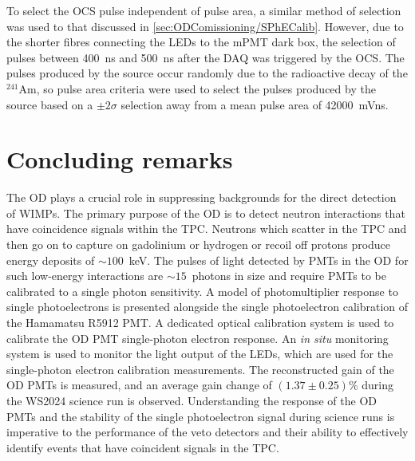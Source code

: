 To select the OCS pulse independent of pulse area, a similar method of selection was used to that discussed in \autoref{sec:ODComissioning/SPhECalib}. However, due to the shorter fibres connecting the LEDs to the mPMT dark box, the selection of pulses between 400~ns and 500~ns after the DAQ was triggered by the OCS. The pulses produced by the source occur randomly due to the radioactive decay of the $^{241}\text{Am}$, so pulse area criteria were used to select the pulses produced by the source based on a $\pm2\sigma$ selection away from a mean pulse area of 42000~mVns.

\pagebreak

\section{Concluding remarks}
The OD plays a crucial role in suppressing backgrounds for the direct detection of WIMPs. The primary purpose of the OD is to detect neutron interactions that have coincidence signals within the TPC. Neutrons which scatter in the TPC and then go on to capture on gadolinium or hydrogen or recoil off protons produce energy deposits of $\sim100$~keV. The pulses of light detected by PMTs in the OD for such low-energy interactions are $\sim15$~photons in size and require PMTs to be calibrated to a single photon sensitivity. A model of photomultiplier response to single photoelectrons is presented alongside the single photoelectron calibration of the Hamamatsu R5912 PMT. A dedicated optical calibration system is used to calibrate the OD PMT single-photon electron response. An \textit{in situ} monitoring system is used to monitor the light output of the LEDs, which are used for the single-photon electron calibration measurements. The reconstructed gain of the OD PMTs is measured, and an average gain change of $(1.37\pm0.25)\%$ during the WS2024 science run is observed. Understanding the response of the OD PMTs and the stability of the single photoelectron signal during science runs is imperative to the performance of the veto detectors and their ability to effectively identify events that have coincident signals in the TPC.